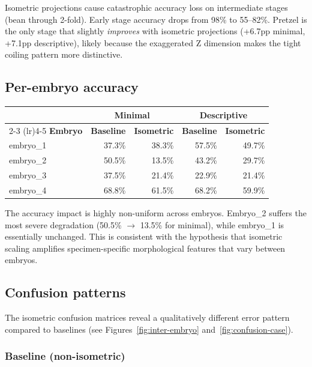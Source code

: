 \documentclass[11pt, a4paper]{article}
\begin{document}
Isometric projections cause catastrophic accuracy loss on intermediate stages
(bean through 2-fold).  Early stage accuracy drops from 98\% to 55--82\%.
Pretzel is the only stage that slightly \emph{improves} with isometric
projections (+6.7pp minimal, +7.1pp descriptive), likely because the
exaggerated Z dimension makes the tight coiling pattern more distinctive.

\subsection{Per-embryo accuracy}

\begin{center}
\small
\begin{tabular}{@{}l*{4}{r}@{}}
\toprule
& \multicolumn{2}{c}{\textbf{Minimal}} & \multicolumn{2}{c}{\textbf{Descriptive}} \\
\cmidrule(lr){2-3} \cmidrule(lr){4-5}
\textbf{Embryo} & \textbf{Baseline} & \textbf{Isometric}
  & \textbf{Baseline} & \textbf{Isometric} \\
\midrule
embryo\_1 & 37.3\% & 38.3\% & 57.5\% & 49.7\% \\
embryo\_2 & 50.5\% & 13.5\% & 43.2\% & 29.7\% \\
embryo\_3 & 37.5\% & 21.4\% & 22.9\% & 21.4\% \\
embryo\_4 & 68.8\% & 61.5\% & 68.2\% & 59.9\% \\
\bottomrule
\end{tabular}
\end{center}

The accuracy impact is highly non-uniform across embryos.  Embryo\_2 suffers
the most severe degradation (50.5\% $\to$ 13.5\% for minimal), while
embryo\_1 is essentially unchanged.  This is consistent with the hypothesis
that isometric scaling amplifies specimen-specific morphological features that
vary between embryos.

\subsection{Confusion patterns}

The isometric confusion matrices reveal a qualitatively different error pattern
compared to baselines (see Figures~\ref{fig:inter-embryo}
and~\ref{fig:confusion-case}).

\subsubsection{Baseline (non-isometric)}
\end{document}
